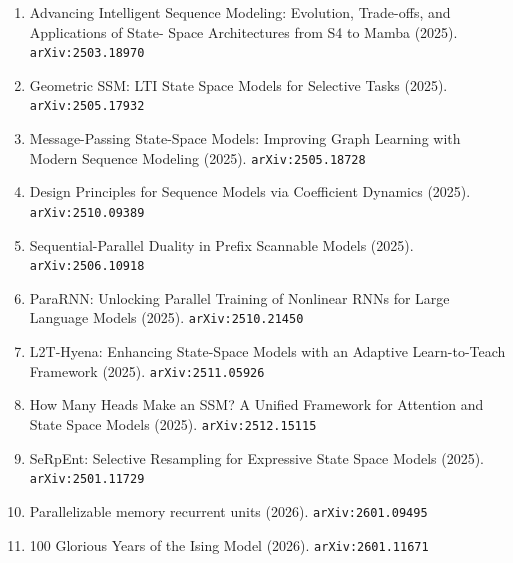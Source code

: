 \documentclass[11pt]{article}
\begin{document}
\begin{enumerate}
  \item Advancing Intelligent Sequence Modeling: Evolution, Trade-offs, and Applications of State- Space Architectures from S4 to Mamba (2025). \texttt{arXiv:2503.18970}
  \item Geometric SSM: LTI State Space Models for Selective Tasks (2025). \texttt{arXiv:2505.17932}
  \item Message-Passing State-Space Models: Improving Graph Learning with Modern Sequence Modeling (2025). \texttt{arXiv:2505.18728}
  \item Design Principles for Sequence Models via Coefficient Dynamics (2025). \texttt{arXiv:2510.09389}
  \item Sequential-Parallel Duality in Prefix Scannable Models (2025). \texttt{arXiv:2506.10918}
  \item ParaRNN: Unlocking Parallel Training of Nonlinear RNNs for Large Language Models (2025). \texttt{arXiv:2510.21450}
  \item L2T-Hyena: Enhancing State-Space Models with an Adaptive Learn-to-Teach Framework (2025). \texttt{arXiv:2511.05926}
  \item How Many Heads Make an SSM? A Unified Framework for Attention and State Space Models (2025). \texttt{arXiv:2512.15115}
  \item SeRpEnt: Selective Resampling for Expressive State Space Models (2025). \texttt{arXiv:2501.11729}
  \item Parallelizable memory recurrent units (2026). \texttt{arXiv:2601.09495}
  \item 100 Glorious Years of the Ising Model (2026). \texttt{arXiv:2601.11671}
\end{enumerate}
\end{document}
